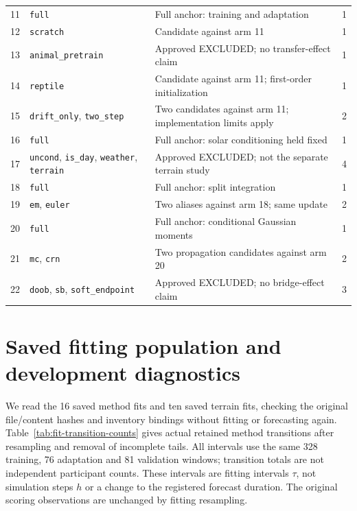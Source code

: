 {\begin{longtable}{p{.06\linewidth}p{.36\linewidth}p{.43\linewidth}r}
11 & \texttt{full} & Full anchor: training and adaptation & 1\\
12 & \texttt{scratch} & Candidate against arm 11 & 1\\
13 & \texttt{animal\_pretrain} & Approved EXCLUDED; no transfer-effect claim & 1\\
14 & \texttt{reptile} & Candidate against arm 11; first-order initialization & 1\\
15 & \texttt{drift\_only}, \texttt{two\_step} & Two candidates against arm 11; implementation limits apply & 2\\
16 & \texttt{full} & Full anchor: solar conditioning held fixed & 1\\
17 & \texttt{uncond}, \texttt{is\_day}, \texttt{weather}, \texttt{terrain} & Approved EXCLUDED; not the separate terrain study & 4\\
18 & \texttt{full} & Full anchor: split integration & 1\\
19 & \texttt{em}, \texttt{euler} & Two aliases against arm 18; same update & 2\\
20 & \texttt{full} & Full anchor: conditional Gaussian moments & 1\\
21 & \texttt{mc}, \texttt{crn} & Two propagation candidates against arm 20 & 2\\
22 & \texttt{doob}, \texttt{sb}, \texttt{soft\_endpoint} & Approved EXCLUDED; no bridge-effect claim & 3\\
\end{longtable}
}


\section{Saved fitting population and development diagnostics}
\label{sec:saved-fit-diagnostics}\hypertarget{sec:saved-fit-diagnostics}{}
We read the 16 saved method fits and ten saved terrain fits, checking the
original file/content hashes and inventory bindings without fitting or
forecasting again. Table~\ref{tab:fit-transition-counts} gives actual retained
method transitions after resampling and removal of incomplete tails.
All intervals use the same 328 training, 76 adaptation and 81 validation
windows; transition totals are not independent participant counts. These
intervals are fitting intervals \(\tau\), not simulation steps \(h\) or a
change to the registered forecast duration. The original scoring observations
are unchanged by fitting resampling.

